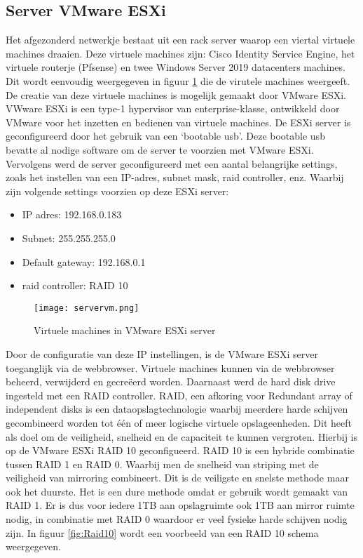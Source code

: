 \subsection{Server VMware ESXi}
Het afgezonderd netwerkje bestaat uit een rack server waarop een viertal virtuele machines draaien. Deze virtuele machines zijn: Cisco Identity Service Engine, het virtuele routerje (Pfsense) en twee  Windows Server 2019 datacenters machines. Dit wordt eenvoudig weergegeven in figuur \ref{fig:vms} die de virutele machines weergeeft. De creatie van deze virtuele machines is mogelijk gemaakt door VMware ESXi. VWware ESXi is een type-1 hypervisor van enterprise-klasse, ontwikkeld door VMware voor het inzetten en bedienen van virtuele machines. 
\newline
\newline
De ESXi server is geconfigureerd door het gebruik van een ‘bootable usb’. Deze bootable usb bevatte al nodige software om de server te voorzien met VMware ESXi. Vervolgens werd de server geconfigureerd met een aantal belangrijke settings, zoals het instellen van een IP-adres, subnet mask, raid controller, enz. Waarbij zijn volgende settings voorzien op deze ESXi server: 

\begin{itemize}
	\item IP adres: 192.168.0.183
	\item Subnet: 255.255.255.0
	\item Default gateway: 192.168.0.1
	\item raid controller: RAID 10
\end{itemize}

\begin{figure}[H]
	\centering
	\texttt{[image: servervm.png]}
	\caption{Virtuele machines in VMware ESXi server}
	\label{fig:vms}
\end{figure}

\newpage
Door de configuratie van deze IP instellingen, is de VMware ESXi server toeganglijk via de webbrowser. Virtuele machines kunnen via de webbrowser beheerd, verwijderd en gecreëerd worden. Daarnaast werd de hard disk drive ingesteld met een RAID controller. RAID, een afkoring voor Redundant array of independent disks is een dataopslagtechnologie waarbij meerdere harde schijven gecombineerd worden tot één of meer logische virtuele opslageenheden. Dit heeft als doel om de veiligheid, snelheid en de capaciteit te kunnen vergroten. Hierbij is op de VMware ESXi RAID 10 geconfigueerd. RAID 10 is een hybride combinatie tussen RAID 1 en RAID 0. Waarbij men de snelheid van striping met de veiligheid van mirroring combineert. 
\newline
\newline
Dit is de veiligste en snelste methode maar ook het duurste. Het is een dure methode omdat er gebruik wordt gemaakt van RAID 1. Er is dus voor iedere 1TB aan opslagruimte ook 1TB aan mirror ruimte nodig, in combinatie met RAID 0 waardoor er veel fysieke harde schijven nodig zijn. In figuur \ref{fig:Raid10} wordt een voorbeeld van een RAID 10 schema weergegeven.

